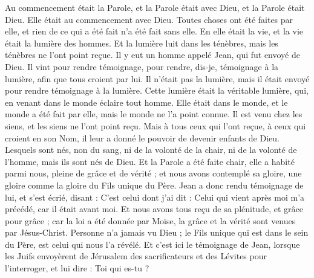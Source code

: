 \begin{multicols}{2}
\VerseOne{}Au commencement était la Parole, et la Parole était avec Dieu, et la Parole était Dieu.
Elle était au commencement avec Dieu.
Toutes choses ont été faites par elle, et rien de ce qui a été fait n'a été fait sans elle.
En elle était la vie, et la vie était la lumière des hommes.
Et la lumière luit dans les ténèbres, mais les ténèbres ne l'ont point reçue.
Il y eut un homme appelé Jean, qui fut envoyé de Dieu.
Il vint pour rendre témoignage, pour rendre, dis-je, témoignage à la lumière, afin que tous croient par lui.
Il n'était pas la lumière, mais il était envoyé pour rendre témoignage à la lumière.
Cette lumière était la véritable lumière, qui, en venant dans le monde éclaire tout homme.
Elle était dans le monde, et le monde a été fait par elle, mais le monde ne l'a point connue.
Il est venu chez les siens, et les siens ne l'ont point reçu.
Mais à tous ceux qui l'ont reçue, à ceux qui croient en son Nom, il leur a donné le pouvoir de devenir enfants de Dieu.
Lesquels sont nés, non du sang, ni de la volonté de la chair, ni de la volonté de l'homme, mais ils sont nés de Dieu.
Et la Parole a été faite chair, elle a habité parmi nous, pleine de grâce et de vérité ; et nous avons contemplé sa gloire, une gloire comme la gloire du Fils unique du Père.
Jean a donc rendu témoignage de lui, et s'est écrié, disant : C'est celui dont j'ai dit : Celui qui vient après moi m'a précédé, car il était avant moi.
Et nous avons tous reçu de sa plénitude, et grâce pour grâce ;
car la loi a été donnée par Moïse, la grâce et la vérité sont venues par Jésus-Christ.
Personne n'a jamais vu Dieu ; le Fils unique qui est dans le sein du Père, est celui qui nous l'a révélé.
Et c'est ici le témoignage de Jean, lorsque les Juifs envoyèrent de Jérusalem des sacrificateurs et des Lévites pour l'interroger, et lui dire : Toi qui es-tu ?

\end{multicols}
